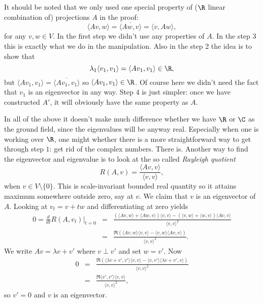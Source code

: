 It should be noted that we only used one special property of ($\R$ linear combination of) projections $A$ in the proof:
\[
	\langle A v, w \rangle = \overline{\langle A w, v \rangle} = \langle v, A w \rangle,
\]
for any $v, w \in V$. In the first step we didn't use any properties of $A$. In the step 3 this is exactly what we do in the manipulation. Also in the step 2 the idea is to show that
\[
	\lambda_{1} \langle v_{1}, v_{1} \rangle = \langle A v_{1}, v_{1} \rangle \in \R,
\]
but $\langle A v_{1}, v_{1} \rangle = \overline{\langle A v_{1}, v_{1} \rangle}$ so $\langle A v_{1}, v_{1} \rangle \in \R$. Of course here we didn't need the fact that $v_{1}$ is an eigenvector in any way. Step 4 is just simpler: once we have constructed $A'$, it will obviously have the same property as $A$.

In all of the above it doesn't make much difference whether we have $\R$ or $\C$ as the ground field, since the eigenvalues will be anyway real. Especially when one is working over $\R$, one might whether there is a more straightforward way to get through step $1$: get rid of the complex numbers. There is. Another way to find the eigenvector and eigenvalue is to look at the so called \textit{Rayleigh quotient}
\[
	R(A, v) = \frac{\langle A v, v \rangle}{\langle v, v \rangle},
\]
when $v \in V \setminus \{0\}$. This is scale-invariant bounded real quantity so it attains maximum somewhere outside zero, say at $v$. We claim that $v$ is an eigenvector of $A$. Looking at $v_{t} = v + t w$ and differentiating at zero yields
\begin{eqnarray*}
	0 = \frac{d}{dt} R(A, v_{t})\Big|_{t = 0} &=& \frac{(\langle A v, w \rangle + \langle A w, v \rangle) \langle v, v \rangle - (\langle v, w \rangle + \langle w, v \rangle) \langle Av, v \rangle}{\langle v, v \rangle^2} \\
	&=& \frac{\Re\left(\langle A v, w \rangle \langle v, v \rangle -  \langle v, w \rangle \langle Av, v \rangle \right)}{\langle v, v \rangle^2}.
\end{eqnarray*}
We write $A v = \lambda v + v'$ where $v \perp v'$ and set $w = v'$. Now
\begin{eqnarray*}
	0 &=& \frac{\Re\left(\langle \lambda v + v', v' \rangle \langle v, v \rangle -  \langle v, v' \rangle \langle \lambda v + v', v \rangle \right)}{\langle v, v \rangle^2} \\
	&=& \frac{\Re\langle v', v' \rangle \langle v, v \rangle}{\langle v, v \rangle^2},
\end{eqnarray*}
so $v' = 0$ and $v$ is an eigenvector.

